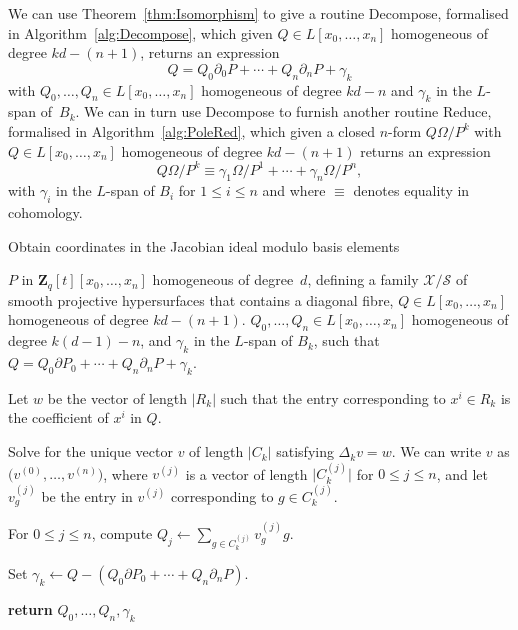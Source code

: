 \documentclass[a4paper,11pt]{article}
\numberwithin{equation}{section}
\providecommand{\abs}[1]{\lvert#1\rvert}                 %
\newcommand{\ZZ}{\mathbf{Z}} %
\theoremstyle{definition}
\begin{document}
We can use Theorem~\ref{thm:Isomorphism} to give a routine {\sc Decompose}, 
formalised in Algorithm~\ref{alg:Decompose}, which given 
$Q \in L[x_0, \dotsc, x_n]$ homogeneous of degree $kd - (n+1)$, 
returns an expression 
\begin{equation*}
Q = Q_0 \partial_0 P + \dotsb + Q_n \partial_n P + \gamma_k
\end{equation*} 
with $Q_0, \dotsc, Q_n \in L[x_0, \dotsc, x_n]$ homogeneous of 
degree $kd-n$ and $\gamma_k$ in the $L$-span of~$B_k$. We can in turn 
use {\sc Decompose} to furnish another routine {\sc Reduce}, formalised 
in Algorithm~\ref{alg:PoleRed}, which given a closed $n$-form $Q\Omega/P^k$ 
with $Q \in L[x_0, \dotsc, x_n]$ homogeneous of degree $kd - (n+1)$ returns 
an expression
\begin{equation*}
Q \Omega / P^k \equiv \gamma_{1} \Omega / P^{1} + \dotsb + \gamma_n \Omega / P^n,
\end{equation*}
with $\gamma_i$ in the $L$-span of $B_i$ for $1 \leq i \leq n$ and 
where $\equiv$ denotes equality in cohomology.


\begin{algorithm}
\caption{Obtain coordinates in the Jacobian ideal modulo basis elements}
\label{alg:Decompose}
\begin{algorithmic}
\Require $P$ in $\ZZ_q[t][x_0, \dotsc, x_n]$ homogeneous of degree~$d$, 
         defining a family $\mathcal{X}/\mathcal{S}$ of smooth projective 
         hypersurfaces that contains a diagonal fibre, 
         $Q \in L[x_0, \dotsc, x_n]$ homogeneous of degree $kd - (n+1)$.
\Ensure  $Q_0, \dotsc, Q_n \in L[x_0, \dotsc, x_n]$ homogeneous of degree 
         $k(d-1)-n$, and $\gamma_k$ in the $L$-span of $B_k$, such that 
         $Q = Q_0 \partial P_0 + \dotsb + Q_n \partial_n P +\gamma_k$.
\State \begin{compactenum}[{\hspace{1em}} 1.] \vspace{-1.24em}
\item Let $w$ be the vector of length $\abs{R_k}$ such that the entry 
      corresponding to $x^i \in R_k$ is the coefficient of 
      $x^i$ in $Q$.
\item Solve for the unique vector $v$ of length $\abs{C_k}$ satisfying 
      $\Delta_k v = w$.  We can write $v$ 
      as $\bigl(v^{(0)}, \dotsc, v^{(n)}\bigr)$, where $v^{(j)}$ is 
      a vector of length $\abs{C_k^{(j)}}$ for $0 \leq j \leq n$,
      and let $v_g^{(j)}$ be the entry in $v^{(j)}$ corresponding 
      to $g \in C_k^{(j)}$.
\item For $0 \leq j \leq n$, compute $Q_j \gets \sum_{g \in C_k^{(j)}} v_g^{(j)} g$.
\item Set $\gamma_k \gets Q-(Q_0 \partial P_0 + \dotsb + Q_n \partial_n P)$.
\item \textbf{return} $Q_0, \dotsc, Q_n,\gamma_k$      
\EndProcedure
\end{compactenum}
\end{algorithmic}
\end{algorithm}
\end{document}
